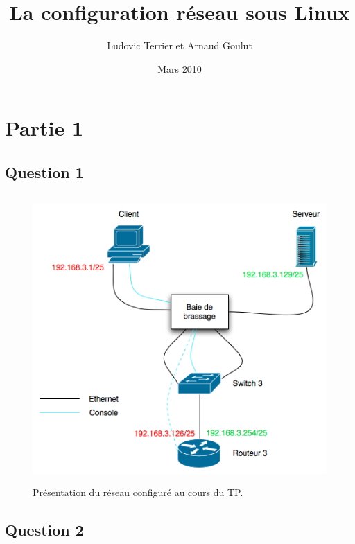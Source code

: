 \documentclass[a4paper,12pt]{article}
\begin{document}
\title{La configuration réseau sous Linux}
\author{Ludovic Terrier et Arnaud Goulut}
\date{Mars 2010}
\maketitle



\thispagestyle{empty}
\newpage



\section{Partie 1}

\subsection{Question 1}
\begin{figure}[!h]
\begin{center}
\includegraphics[height=11cm]{Diag.png}
\caption{Présentation du réseau configuré au cours du TP.}
\label{fig:do}
\end{center}
\end{figure}
\subsection{Question 2}
\end{document}
